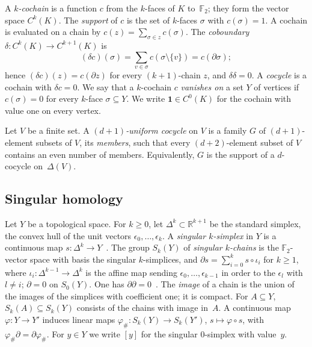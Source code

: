 \documentclass[11pt]{article}
\theoremstyle{definition}
\numberwithin{equation}{section}
\newcommand{\F}{\mathbb F_2}
\newcommand{\one}{\boldsymbol 1}
\newcommand{\R}{\mathbb R}
\begin{document}
A \emph{$k$-cochain} is a function $c$ from the $k$-faces of $K$ to~$\F$; they form the vector space $C^k(K)$. The \emph{support} of $c$ is the set of $k$-faces $\sigma$ with $c(\sigma)=1$. A cochain is evaluated on a chain by $c(z)=\sum_{\sigma\in z}c(\sigma)$. The \emph{coboundary} $\delta:C^k(K)\to C^{k+1}(K)$ is
\begin{equation*}
 (\delta c)(\sigma)=\sum_{v\in\sigma}c(\sigma\setminus\{v\})=c(\partial\sigma);
\end{equation*}
hence $(\delta c)(z)=c(\partial z)$ for every $(k+1)$-chain $z$, and $\delta\delta=0$. A \emph{cocycle} is a cochain with $\delta c=0$. We say that a $k$-cochain $c$ \emph{vanishes on} a set $Y$ of vertices if $c(\sigma)=0$ for every $k$-face $\sigma\subseteq Y$. We write $\one\in C^0(K)$ for the cochain with value one on every vertex.

Let $V$ be a finite set. A \emph{$(d+1)$-uniform cocycle} on $V$ is a family $G$ of $(d+1)$-element subsets of $V$, its \emph{members}, such that every $(d+2)$-element subset of $V$ contains an even number of members. Equivalently, $G$ is the support of a $d$-cocycle on~$\Delta(V)$.

\subsection{Singular homology}\label{sec:singular}

Let $Y$ be a topological space. For $k\ge0$, let $\Delta^k\subset\R^{k+1}$ be the standard simplex, the convex hull of the unit vectors $\epsilon_0,\ldots,\epsilon_k$. A \emph{singular $k$-simplex} in $Y$ is a continuous map $s:\Delta^k\to Y$~\cite[p.~108]{Hatcher}. The group $S_k(Y)$ of \emph{singular $k$-chains} is the $\F$-vector space with basis the singular $k$-simplices, and $\partial s=\sum_{i=0}^ks\circ\iota_i$ for $k\ge1$, where $\iota_i:\Delta^{k-1}\to\Delta^k$ is the affine map sending $\epsilon_0,\ldots,\epsilon_{k-1}$ in order to the $\epsilon_l$ with $l\ne i$; $\partial=0$ on $S_0(Y)$. One has $\partial\partial=0$~\cite[p.~108 and p.~153]{Hatcher}. The \emph{image} of a chain is the union of the images of the simplices with coefficient one; it is compact. For $A\subseteq Y$, $S_k(A)\subseteq S_k(Y)$ consists of the chains with image in~$A$. A continuous map $\varphi:Y\to Y'$ induces linear maps $\varphi_\#:S_k(Y)\to S_k(Y')$, $s\mapsto\varphi\circ s$, with $\varphi_\#\partial=\partial\varphi_\#$. For $y\in Y$ we write $[y]$ for the singular $0$-simplex with value~$y$.
\end{document}
